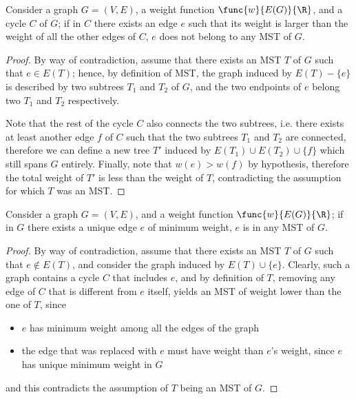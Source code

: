 \documentclass[a4paper, 12pt]{report}
\begin{document}
    \begin{framedlem}{}
        Consider a graph $G = (V, E)$, a weight function $\func{w}{E(G)}{\R}$, and a cycle $C$ of $G$; if in $C$ there exists an edge $e$ such that its weight is larger than the weight of all the other edges of $C$, $e$ does not belong to any MST of $G$.
    \end{framedlem}
    
    \begin{proof}
        By way of contradiction, assume that there exists an MST $T$ of $G$ such that $e \in E(T)$; hence, by definition of MST, the graph induced by $E(T) - \{e\}$ is described by two subtrees $T_1$ and $T_2$ of $G$, and the two endpoints of $e$ belong two $T_1$ and $T_2$ respectively.

        Note that the rest of the cycle $C$ also connects the two subtrees, i.e. there exists at least another edge $f$ of $C$ such that the two subtrees $T_1$ and $T_2$ are connected, therefore we can define a new tree $T'$ induced by $E(T_1) \cup E(T_2) \cup \{f\}$ which still spans $G$ entirely. Finally, note that $w(e) > w(f)$ by hypothesis, therefore the total weight of $T'$ is less than the weight of $T$, contradicting the assumption for which $T$ was an MST.
    \end{proof}

    \begin{framedlem}{}
        Consider a graph $G = (V, E)$, and a weight function $\func{w}{E(G)}{\R}$; if in $G$ there exists a unique edge $e$ of minimum weight, $e$ is in any MST of $G$.
    \end{framedlem}

    \begin{proof}
        By way of contradiction, assume that there exists an MST $T$ of $G$ such that $e \notin E(T)$, and consider the graph induced by $E(T) \cup \{e\}$. Clearly, such a graph contains a cycle $C$ that includes $e$, and by definition of $T$, removing any edge of $C$ that is different from $e$ itself, yields an MST of weight lower than the one of $T$, since

        \begin{itemize}
            \item $e$ has minimum weight among all the edges of the graph
            \item the edge that was replaced with $e$ must have  weight than $e$'s weight, since $e$ has unique minimum weight in $G$
        \end{itemize}

        and this contradicts the assumption of $T$ being an MST of $G$.
    \end{proof}
    
\end{document}
